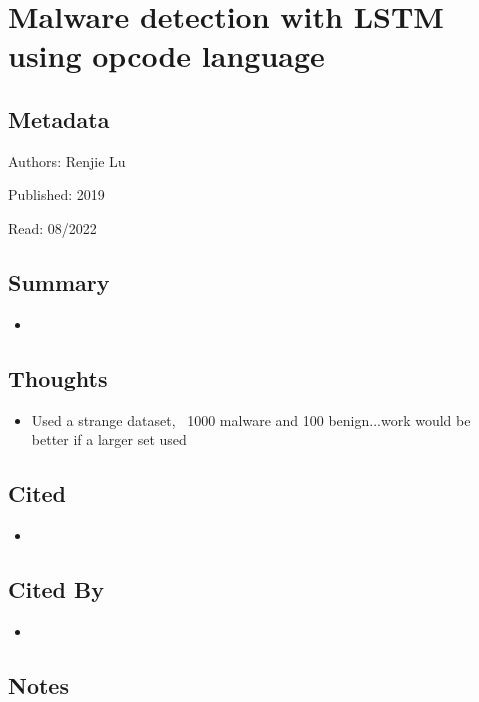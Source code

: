 \documentclass{article}
\begin{document}
\pagebreak


\section*{Malware detection with LSTM using opcode language}

\subsection*{Metadata}

\noindent Authors: Renjie Lu

\noindent Published: 2019

\noindent Read: 08/2022

\subsection*{Summary}
\begin{itemize}
\item 
\end{itemize}

\subsection*{Thoughts}
\begin{itemize}
\item Used a strange dataset, ~1000 malware and 100 benign...work would be better if a larger set used
\end{itemize}

\subsection*{Cited}
\begin{itemize}
\item
\end{itemize}

\subsection*{Cited By}
\begin{itemize}
\item
\end{itemize}

\subsection*{Notes}
\end{document}
